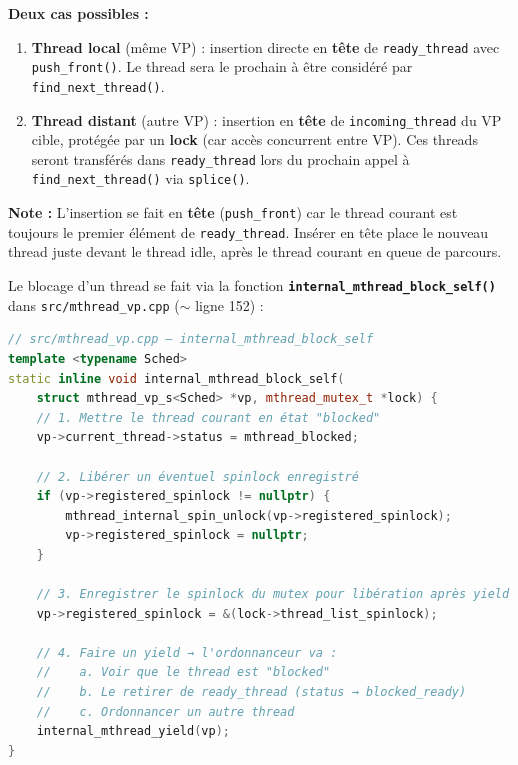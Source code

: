 \documentclass[11pt,a4paper]{article}
\newcommand{\question}[1]{%
  \bigskip\noindent{\large\bfseries\color{questioncolor}#1}\par\medskip}
\let\oldtexttt\texttt
\renewcommand{\texttt}[1]{\oldtexttt{\color{keyword}#1}}
\begin{document}
\textbf{Deux cas possibles :}
\begin{enumerate}
  \item \textbf{Thread local} (même VP) : insertion directe en \textbf{tête} de \texttt{ready\_thread} avec \texttt{push\_front()}. Le thread sera le prochain à être considéré par \texttt{find\_next\_thread()}.
  \item \textbf{Thread distant} (autre VP) : insertion en \textbf{tête} de \texttt{incoming\_thread} du VP cible, protégée par un \textbf{lock} (car accès concurrent entre VP). Ces threads seront transférés dans \texttt{ready\_thread} lors du prochain appel à \texttt{find\_next\_thread()} via \texttt{splice()}.
\end{enumerate}

\textbf{Note :} L'insertion se fait en \textbf{tête} (\texttt{push\_front}) car le thread courant est toujours le premier élément de \texttt{ready\_thread}. Insérer en tête place le nouveau thread juste devant le thread idle, après le thread courant en queue de parcours.

\question{Q.14 : Comment bloquer un thread}

Le blocage d'un thread se fait via la fonction \textbf{\texttt{internal\_mthread\_block\_self()}} dans \texttt{src/mthread\_vp.cpp} (\(\sim\) ligne 152) :

\begin{lstlisting}[language=C++]
// src/mthread_vp.cpp — internal_mthread_block_self
template <typename Sched>
static inline void internal_mthread_block_self(
    struct mthread_vp_s<Sched> *vp, mthread_mutex_t *lock) {
    // 1. Mettre le thread courant en état "blocked"
    vp->current_thread->status = mthread_blocked;

    // 2. Libérer un éventuel spinlock enregistré
    if (vp->registered_spinlock != nullptr) {
        mthread_internal_spin_unlock(vp->registered_spinlock);
        vp->registered_spinlock = nullptr;
    }

    // 3. Enregistrer le spinlock du mutex pour libération après yield
    vp->registered_spinlock = &(lock->thread_list_spinlock);

    // 4. Faire un yield → l'ordonnanceur va :
    //    a. Voir que le thread est "blocked"
    //    b. Le retirer de ready_thread (status → blocked_ready)
    //    c. Ordonnancer un autre thread
    internal_mthread_yield(vp);
}
\end{lstlisting}
\end{document}
